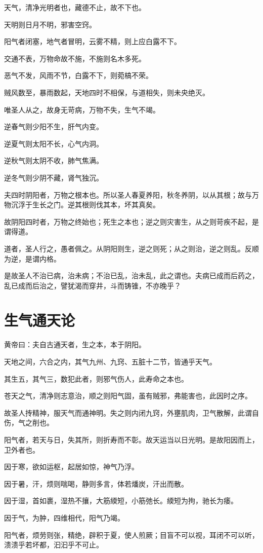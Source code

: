 \documentclass{article}%
\begin{document}
天气，清净光明者也，藏德不止，故不下也。

天明则日月不明，邪害空窍。

阳气者闭塞，地气者冒明，云雾不精，则上应白露不下。

交通不表，万物命故不施，不施则名木多死。

恶气不发，风雨不节，白露不下，则菀槁不荣。

贼风数至，暴雨数起，天地四时不相保，与道相失，则未央绝灭。

唯圣人从之，故身无苛病，万物不失，生气不竭。

逆春气则少阳不生，肝气内变。

逆夏气则太阳不长，心气内洞。

逆秋气则太阴不收，肺气焦满。

逆冬气则少阴不藏，肾气独沉。

夫四时阴阳者，万物之根本也。所以圣人春夏养阳，秋冬养阴，以从其根；故与万物沉浮于生长之门。逆其根则伐其本，坏其真矣。

故阴阳四时者，万物之终始也；死生之本也；逆之则灾害生，从之则苛疾不起，是谓得道。

道者，圣人行之，愚者佩之。从阴阳则生，逆之则死；从之则治，逆之则乱。反顺为逆，是谓内格。

是故圣人不治已病，治未病；不治已乱，治未乱，此之谓也。夫病已成而后药之，乱已成而后治之，譬犹渴而穿井，斗而铸锥，不亦晚乎？
\section{生气通天论}
黄帝曰：夫自古通天者，生之本，本于阴阳。

天地之间，六合之内，其气九州、九窍、五脏十二节，皆通乎天气。

其生五，其气三，数犯此者，则邪气伤人，此寿命之本也。

苍天之气，清净则志意治，顺之则阳气固，虽有贼邪，弗能害也，此因时之序。

故圣人抟精神，服天气而通神明。失之则内闭九窍，外壅肌肉，卫气散解，此谓自伤，气之削也。

阳气者，若天与日，失其所，则折寿而不彰。故天运当以日光明。是故阳因而上，卫外者也。

因于寒，欲如运枢，起居如惊，神气乃浮。

因于暑，汗，烦则喘喝，静则多言，体若燔炭，汗出而散。

因于湿，首如裹，湿热不攘，大筋緛短，小筋弛长。緛短为拘，驰长为痿。

因于气，为肿，四维相代，阳气乃竭。

阳气者，烦劳则张，精绝，辟积于夏，使人煎厥；目盲不可以视，耳闭不可以听，溃溃乎若坏都，汩汩乎不可止。
\end{document}
